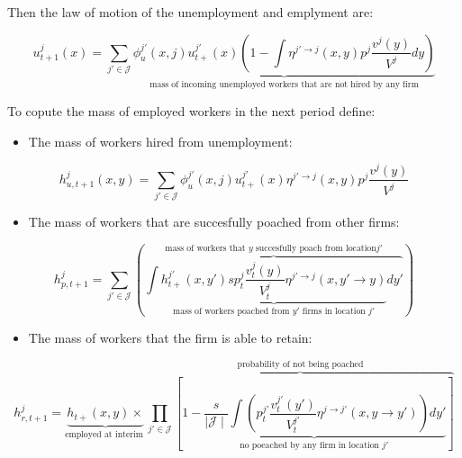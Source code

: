 \documentclass[
  letterpaper,
  DIV=11,
  numbers=noendperiod]{scrreprt}
\providecommand{\tightlist}{%
  \setlength{\itemsep}{0pt}\setlength{\parskip}{0pt}}\usepackage{longtable,booktabs,array}
\begin{document}
Then the law of motion of the unemployment and emplyment are:

\begin{equation}
u^{j}_{t+1}(x) = \sum_{j'\in \mathcal{J}}\underbrace{\phi_u^{j'}(x,j) u^{j'}_{t+}(x)\left( 1 - \int \eta^{j'\to j}(x,y) p^j\frac{v^j(y)}{V^j}dy \right)}_{\text{mass of incoming unemployed workers that are not hired by any firm}}
\end{equation}

To copute the mass of employed workers in the next period define:

\begin{itemize}
\tightlist
\item
  The mass of workers hired from unemployment:
\end{itemize}

\begin{equation}
h^j_{u, t+1}(x,y) = \sum_{j'\in \mathcal{J}}\phi_u^{j'}(x,j) u^{j'}_{t+}(x)\eta^{j'\to j}(x,y) p^j\frac{v^j(y)}{V^j}
\end{equation}

\begin{itemize}
\tightlist
\item
  The mass of workers that are succesfully poached from other firms:
\end{itemize}

\begin{equation}
h^j_{p, t+1} = \sum_{j'\in \mathcal{J}}\left(\overbrace{\int\underbrace{ h^{j'}_{t+}(x,y')sp^j_t\frac{v^{j}_t(y)}{V^{j}_t}\eta^{j'\to j}(x,y'\to y)}_{\text{mass of workers poached from } y' \text{ firms in location } j'}dy'}^{\text{mass of workers that } y \text{ succesfully poach from location} j'} \right)
\end{equation}

\begin{itemize}
\tightlist
\item
  The mass of workers that the firm is able to retain:
\end{itemize}

\begin{equation}
h^j_{r,t+1} = \underbrace{h_{t+}(x,y)  \times }_{\text{employed at interim }} \overbrace{\prod_{j'\in\mathcal{J}}\left[ \underbrace{1 - \frac{s}{\mid \mathcal{J} \mid}\int\left( p^{j'}_t\frac{v^{j'}_t(y')}{V^{j'}_t} \eta^{j\to j'}(x,y\to y')\right)dy'}_{\text{no poeached by any firm in location }j'} \right]}^{\text{probability of not being poached}}
\end{equation}
\end{document}
